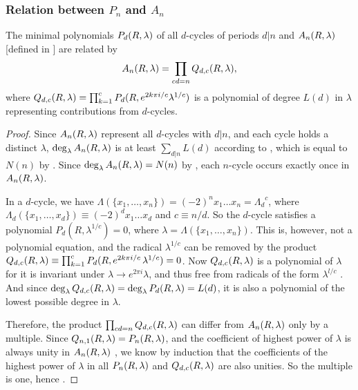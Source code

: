 \documentclass{ws-ijbc}
\begin{document}
\subsubsection{Relation between $P_n$ and $A_n$}



\begin{theorem}
The minimal polynomials $P_d(R, \lambda)$ of all $d$-cycles
  of periods $d|n$
and $A_n(R, \lambda)$ [defined in ] are related by
  \begin{equation}
    A_n(R, \lambda) = \prod_{cd = n} Q_{d, c}(R, \lambda),
    \label{eq:prod}
  \end{equation}
  where
  $Q_{d,c}(R, \lambda) = \prod_{k=1}^{c} P_d(R, e^{2 k \pi i/c} \lambda^{1/c})$
  is a polynomial of degree $L(d)$ in $\lambda$
  representing contributions from $d$-cycles.
\label{thm:prod}
\end{theorem}

\begin{proof}
Since $A_n(R, \lambda)$ represent all $d$-cycles with $d|n$,
and each cycle holds a distinct $\lambda$,
  $\deg_\lambda A_n(R, \lambda)$
  is at least $\sum_{d|n} L(d)$
  according to ,
  which is equal to
  $N(n)$ by .
Since $\deg_\lambda A_n(R, \lambda) = N(n)$ by ,
  each $n$-cycle occurs exactly once in $A_n(R, \lambda)$.


In a $d$-cycle,
 we have $\Lambda(\{x_1, \ldots, x_n\}) = (-2)^n x_1 \dots x_n
   = {\Lambda_d}^c$,
where
$\Lambda_d(\{x_1, \ldots, x_d\}) \equiv (-2)^d x_1 \dots x_d$
and
$c \equiv n/d$.
So the $d$-cycle satisfies a polynomial
  $P_d(R, \lambda^{1/c}) = 0$,
where $\lambda = \Lambda(\{x_1,\ldots,x_n\})$.
%
This is, however, not a polynomial equation, and
%
the radical $\lambda^{1/c}$ can be removed by the product
$Q_{d,c}(R, \lambda)
  \equiv \prod_{k=1}^c P_d(R, e^{2k\pi i/c} \, \lambda^{1/c}) = 0$.
%
Now $Q_{d,c}(R, \lambda)$ is a polynomial of $\lambda$
  for it is invariant under
  $\lambda \rightarrow e^{2\pi i} \lambda$,
and thus free from radicals of the form $\lambda^{l/c}$
  \big[if $(l, c) \ne c$\big].
And since
  $\deg_\lambda Q_{d,c}(R, \lambda)
    = \deg_\lambda P_d(R, \lambda) = L(d)$,
  it is also a polynomial
  of the lowest possible degree in $\lambda$.


Therefore, the product $\prod_{cd=n} Q_{d,c}(R, \lambda)$
  can differ from $A_n(R, \lambda)$ only by
  a multiple.
Since $Q_{n,1}(R, \lambda) = P_n(R, \lambda)$,
  and the coefficient of highest power of $\lambda$ is always
  unity in $A_n(R, \lambda)$ ,
  we know by induction that the coefficients of the highest power of $\lambda$
  in all $P_n(R, \lambda)$ and $Q_{d,c}(R, \lambda)$
  are also unities.
So the multiple is one, hence .
%
%
%
\end{proof}
\end{document}
